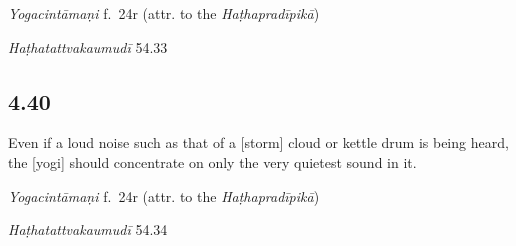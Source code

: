 \begin{ekdosis}
\begin{testimonia}[hp04_039]
\emph{Yogacintāmaṇi} f.~24r (attr. to the \emph{Haṭhapradīpikā})
\begin{versinnote}
\end{versinnote}

\emph{Haṭhatattvakaumudī} 54.33
\begin{versinnote}
\end{versinnote}
\end{testimonia}


\subsection*{4.40}
\begin{translation}[hp04_040]
Even if a loud noise such as that of a [storm] cloud or kettle drum is being heard, the [yogi] should concentrate on only the very quietest sound in it.
\end{translation}


\begin{testimonia}[hp04_040]
\emph{Yogacintāmaṇi} f.~24r (attr. to the \emph{Haṭhapradīpikā})
\begin{versinnote}
\end{versinnote}

\emph{Haṭhatattvakaumudī} 54.34
\begin{versinnote}
\end{versinnote}
\end{testimonia}


\end{ekdosis}
